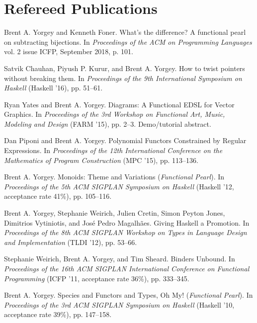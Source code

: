 \documentclass[12pt]{article}
\newcommand{\cvitem}{\par\hangpara{2em}{1}}
\begin{document}
\section*{Refereed Publications}

\cvitem Brent A. Yorgey and Kenneth Foner. What's the difference? A
functional pearl on subtracting bijections.  In \emph{Proceedings of
  the ACM on Programming Languages} vol. 2 issue ICFP, September 2018,
  p. 101.

\cvitem Satvik Chauhan, Piyush P. Kurur, and Brent A. Yorgey. How to
twist pointers without breaking them. In \emph{Proceedings of the 9th
  International Symposium on Haskell} (Haskell '16), pp. 51--61.

\cvitem Ryan Yates and Brent A. Yorgey. Diagrams: A Functional EDSL
for Vector Graphics. In \emph{Proceedings of the 3rd Workshop on
  Functional Art, Music, Modeling and Design} (FARM '15), pp. 2--3.
  Demo/tutorial abstract.

\cvitem Dan Piponi and Brent A. Yorgey.  Polynomial Functors
Constrained by Regular Expressions.  In \emph{Proceedings of the 12th
  International Conference on the Mathematics of Program Construction}
(MPC '15), pp. 113--136.

\cvitem Brent A. Yorgey. Monoids: Theme and Variations
(\emph{Functional Pearl}).  In \emph{Proceedings of the 5th ACM
  SIGPLAN Symposium on Haskell} (Haskell '12, acceptance rate 41\%),
pp. 105--116.

\cvitem Brent A. Yorgey, Stephanie Weirich, Julien Cretin, Simon
Peyton Jones, Dimitrios Vytiniotis, and Jos\'e Pedro
Magalh\~aes. Giving Haskell a Promotion. In \emph{Proceedings of the
  8th ACM SIGPLAN Workshop on Types in Language Design and
  Implementation} (TLDI '12), pp. 53--66.

\cvitem Stephanie Weirich, Brent A. Yorgey, and Tim Sheard. Binders
Unbound. In \emph{Proceedings of the 16th ACM SIGPLAN International
  Conference on Functional Programming} (ICFP '11, acceptance rate
  36\%), pp. 333--345.

\cvitem Brent A. Yorgey. Species and Functors and Types, Oh
  My! (\emph{Functional Pearl}). In \emph{Proceedings of the 3rd ACM SIGPLAN
  Symposium on Haskell} (Haskell '10, acceptance rate 39\%), pp. 147--158.


\end{document}
